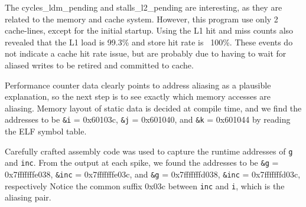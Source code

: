 \documentclass[10pt, conference, compsocconf]{IEEEtran}
\begin{document}
The cycles\_ldm\_pending and stalls\_l2\_pending are interesting, as they are related to the memory and cache system.
However, this program use only 2 cache-lines, except for the initial startup.
Using the L1 hit and miss counts also revealed that the L1 load is 99.3\% and store hit rate is ~100\%.
These events do not indicate a cache hit rate issue, but are probably due to having to wait for aliased writes to be retired and committed to cache.

Performance counter data clearly points to address aliasing as a plausible explanation, so the next step is to see exactly which memory accesses are aliasing.
Memory layout of static data is decided at compile time, and we find the addresses to be \texttt{\&i} = 0x60103c, \texttt{\&j} = 0x601040, and \texttt{\&k} = 0x601044 by reading the ELF symbol table.%

Carefully crafted assembly code was used to capture the runtime addresses of \texttt{g} and \texttt{inc}.
From the output at each spike, we found the addresses to be \texttt{\&g} = 0x7fffffffe038, \texttt{\&inc} = 0x7fffffffe03c, and \texttt{\&g} = 0x7fffffffd038, \texttt{\&inc} = 0x7fffffffd03c, respectively
Notice the common suffix 0x03c between \texttt{inc} and \texttt{i}, which is the aliasing pair.


% 
 
\end{document}
